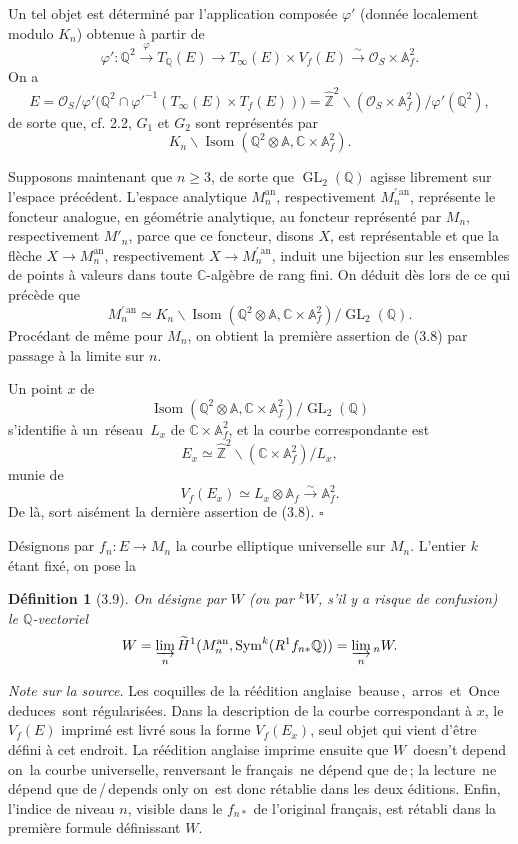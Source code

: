 \documentclass[10pt]{article}
\newcommand{\A}{\mathbb A}
\newcommand{\Af}{\mathbb A_f}
\newcommand{\C}{\mathbb C}
\newcommand{\Q}{\mathbb Q}
\newcommand{\bZ}{\widehat{\mathbb Z}}
\newcommand{\GL}{\operatorname{GL}}
\newcommand{\Isom}{\operatorname{Isom}}
\newcommand{\Sym}{\operatorname{Sym}}
\newcommand{\cO}{\mathcal O}
\newcommand{\an}{\mathrm{an}}
\newcommand{\QED}{\hfill$\square$}
\newcommand{\frquote}[1]{\guillemotleft{}\,#1\,\guillemotright{}}
\newtheorem*{definition}{Définition}
\begin{document}
Un tel objet est déterminé par l'application composée $\varphi'$ (donnée localement modulo
$K_n$) obtenue à partir de
\[
\varphi':\Q^2\xrightarrow{\varphi}T_\Q(E)
\longrightarrow T_\infty(E)\times V_f(E)
\xrightarrow{\sim}\cO_S\times \Af^2.
\]
On a
\[
E=
\cO_S\big/
\varphi'\bigl(\Q^2\cap \varphi'^{-1}(T_\infty(E)\times T_f(E))\bigr)
=
\bZ^2\backslash(\cO_S\times\Af^2)\big/\varphi'(\Q^2),
\]
de sorte que, cf. 2.2, $G_1$ et $G_2$ sont représentés par
\[
K_n\backslash\Isom(\Q^2\otimes\A,\C\times\Af^2).
\]

Supposons maintenant que $n\ge 3$, de sorte que $\GL_2(\Q)$ agisse librement sur l'espace
précédent. L'espace analytique $M_n^{\an}$, respectivement $M_n^{\prime\,\an}$, représente
le foncteur analogue, en géométrie analytique, au foncteur représenté par $M_n$,
respectivement $M'_n$, parce que ce foncteur, disons $X$, est représentable et que la
flèche $X\to M_n^{\an}$, respectivement $X\to M_n^{\prime\,\an}$, induit une bijection sur
les ensembles de points à valeurs dans toute $\C$-algèbre de rang fini. On déduit dès lors de
ce qui précède que
\[
M_n^{\prime\,\an}\simeq
K_n\backslash\Isom(\Q^2\otimes\A,\C\times\Af^2)/\GL_2(\Q).
\]
Procédant de même pour $M_n$, on obtient la première assertion de (3.8) par passage
à la limite sur $n$.

Un point $x$ de
\[
\Isom(\Q^2\otimes\A,\C\times\Af^2)/\GL_2(\Q)
\]
s'identifie à un \frquote{réseau} $L_x$ de $\C\times\Af^2$, et la courbe correspondante est
\[
E_x\simeq \bZ^2\backslash(\C\times\Af^2)/L_x,
\]
munie de
\[
V_f(E_x)\simeq L_x\otimes\Af\xrightarrow{\sim}\Af^2.
\]
De là, sort aisément la dernière assertion de (3.8). \QED

Désignons par $f_n:E\to M_n$ la courbe elliptique universelle sur $M_n$. L'entier $k$ étant
fixé, on pose la

\begin{definition}[3.9]
On désigne par $W$ (ou par ${}^kW$, s'il y a risque de confusion) le $\Q$-vectoriel
\[
W=\varinjlim_n\widetilde H^1(M_n^{\an},\Sym^k(R^1f_{n*}\Q))
=\varinjlim_n {}_nW.
\]
\end{definition}

\noindent\emph{Note sur la source.} Les coquilles de la réédition anglaise \frquote{beause},
\frquote{arros} et \frquote{Once deduces} sont régularisées. Dans la description de la courbe
correspondant à $x$, le $V_f(E)$ imprimé est livré sous la forme $V_f(E_x)$, seul objet qui
vient d'être défini à cet endroit. La réédition anglaise imprime ensuite que $W$ \frquote{doesn't
depend on} la courbe universelle, renversant le français \frquote{ne dépend que de}; la lecture
\frquote{ne dépend que de}/\frquote{depends only on} est donc rétablie dans les deux éditions.
Enfin, l'indice de niveau $n$, visible dans le $f_{n*}$ de l'original français, est rétabli
dans la première formule définissant $W$.
\end{document}
